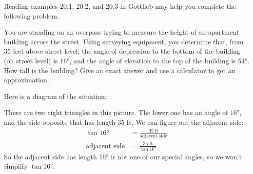 \documentclass{article}
\begin{document}
\begin{enumerate}

  Reading examples 20.1, 20.2, and 20.3 in Gottlieb may help you complete the
  following problem.

  \begin{problem}[\stretch{2}]
    You are standing on an overpass trying to measure the height of an apartment building across the street. Using surveying equipment, you determine that, from 35 feet above street level, the angle of depression to the bottom of the building (on
    street level) is \ang{16}, and the angle of elevation to the top of the building is \ang{54}. How tall is the building? Give an exact answer and use a calculator to get an approximation.
  \end{problem}

  \begin{solution}
    Here is a diagram of the situation:
    \begin{center}
    \end{center}
    There are two right triangles in this picture.  The lower one has an
    angle of $\ang{16}$, and the side opposite that has length $35$ ft.
    We can figure out the adjacent side: 
    \begin{align*}
    \tan \ang{16} &=
    \frac{35\text{ ft}}{\text{adjacent side}} \\
    \text{adjacent side} &= \frac{35\text{ ft}}{\tan\ang{16}}
    \end{align*}
    So the adjacent side has length
    $\ang{16}$ is not one of our special
    angles, so we won't simplify $\tan\ang{16}$.
    

\end{solution}
\end{enumerate}
\end{document}
